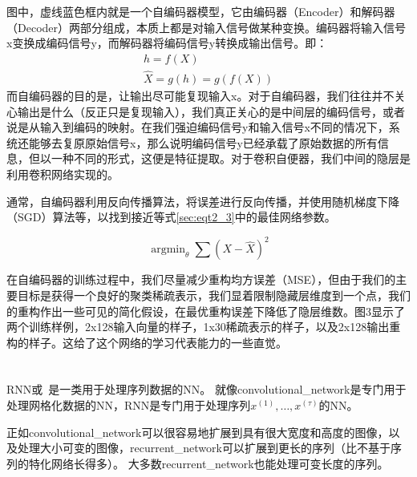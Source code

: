 图中，虚线蓝色框内就是一个自编码器模型，它由编码器（Encoder）和解码器（Decoder）两部分组成，本质上都是对输入信号做某种变换。编码器将输入信号x变换成编码信号y，而解码器将编码信号y转换成输出信号。即：
\begin{equation}
	\begin{gathered}
		h=f(X)
		\\
		\hat{X}=g(h)=g(f(X))
	\end{gathered}
\end{equation}
而自编码器的目的是，让输出尽可能复现输入x。对于自编码器，我们往往并不关心输出是什么（反正只是复现输入），我们真正关心的是中间层的编码信号，或者说是从输入到编码的映射。在我们强迫编码信号y和输入信号x不同的情况下，系统还能够去复原原始信号x，那么说明编码信号y已经承载了原始数据的所有信息，但以一种不同的形式，这便是特征提取。对于卷积自便器，我们中间的隐层是利用卷积网络实现的。\par

通常，自编码器利用反向传播算法，将误差进行反向传播，并使用随机梯度下降（SGD）算法等，以找到接近等式\ref{sec:eqt2_3}中的最佳网络参数。

\begin{equation}\label{sec:eqt2_3}
\mathop{\arg\min}_{\theta} \sum(X − \hat{X})^2
\end{equation}

在自编码器的训练过程中，我们尽量减少重构均方误差（MSE），但由于我们的主要目标是获得一个良好的聚类稀疏表示，我们显着限制隐藏层维度到一个点，我们的重构作出一些可见的简化假设，在最优重构误差下降低了隐层维数。图3显示了两个训练样例，2x128输入向量的样子，1x30稀疏表示的样子，以及2x128输出重构的样子。这给了这个网络的学习代表能力的一些直觉。\par


\section{}
\label{sec:lstm}
\label{chap:sequence_modeling_recurrent_and_recursive_nets}
\gls{RNN}或~是一类用于处理序列数据的\gls{NN}。
就像\gls{convolutional_network}是专门用于处理网格化数据的\gls{NN}，\gls{RNN}是专门用于处理序列$x^{(1)}, \dots, x^{(\tau)}$的\gls{NN}。

正如\gls{convolutional_network}可以很容易地扩展到具有很大宽度和高度的图像，以及处理大小可变的图像，\gls{recurrent_network}可以扩展到更长的序列（比不基于序列的特化网络长得多）。
大多数\gls{recurrent_network}也能处理可变长度的序列。


